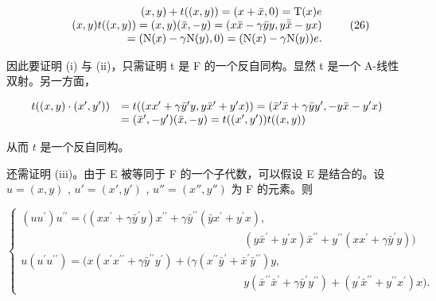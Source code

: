 \[
\begin{array}{r l r} & & {(x, y) + t ((x, y)) = (x + \bar {x}, 0) = \mathrm{T} (x) e} \\ & & {(x, y) t ((x, y)) = (x, y) (\bar {x}, - y) = (x \bar {x} - \gamma \bar {y} y, y \bar {\bar {x}} - y x)} \\ & & {= (\mathrm{N} (x) - \gamma \mathrm{N} (y), 0) = (\mathrm{N} (x) - \gamma \mathrm{N} (y)) e.} \end{array}\tag{26}
\]

因此要证明 (i) 与 (ii)，只需证明 t 是 F 的一个反自同构。显然 t 是一个 A-线性双射。另一方面，

\[
\begin{array}{r l} t ((x, y) \cdot (x ^ {\prime}, y ^ {\prime})) & = t ((x x ^ {\prime} + \gamma \bar {y} ^ {\prime} y, y \bar {x} ^ {\prime} + y ^ {\prime} x)) = (\bar {x} ^ {\prime} \bar {x} + \gamma \bar {y} y ^ {\prime}, - y \bar {x} - y ^ {\prime} x) \\ & = (\bar {x} ^ {\prime}, - y ^ {\prime}) (\bar {x}, - y) = t ((x ^ {\prime}, y ^ {\prime})) t ((x, y)) \end{array}
\]

从而 \(t\) 是一个反自同构。

还需证明 (iii)。由于 E 被等同于 F 的一个子代数，可以假设 E 是结合的。设 \(u = (x, y)\) , \(u' = (x', y')\) , \(u'' = (x'', y'')\) 为 F 的元素。则

\[
\left\{ \begin{array}{l} (u u ^ {\prime}) u ^ {\prime \prime} = ((x x ^ {\prime} + \gamma \bar {y} ^ {\prime} y) x ^ {\prime \prime} + \gamma \bar {y} ^ {\prime \prime} (\bar {y} x ^ {\prime} + y ^ {\prime} x), \\ \qquad \qquad \qquad \qquad \qquad \qquad \qquad \qquad \qquad \qquad (y \bar {x} ^ {\prime} + y ^ {\prime} x) \bar {x} ^ {\prime \prime} + y ^ {\prime \prime} (x x ^ {\prime} + \gamma \bar {y} ^ {\prime} y)) \\ u (u ^ {\prime} u ^ {\prime \prime}) = (x (x ^ {\prime} x ^ {\prime \prime} + \gamma \bar {y} ^ {\prime \prime} y ^ {\prime}) + (\gamma (x ^ {\prime \prime} \bar {y} ^ {\prime} + \bar {x} ^ {\prime} \bar {y} ^ {\prime \prime}) y, \\ \qquad \qquad \qquad \qquad \qquad \qquad \qquad \qquad \qquad \qquad y (\bar {x} ^ {\prime \prime} \bar {x} ^ {\prime} + \gamma \bar {y} ^ {\prime} y ^ {\prime \prime}) + (y ^ {\prime} \bar {x} ^ {\prime \prime} + y ^ {\prime \prime} x ^ {\prime}) x). \end{array} \right.\tag{27}
\]

